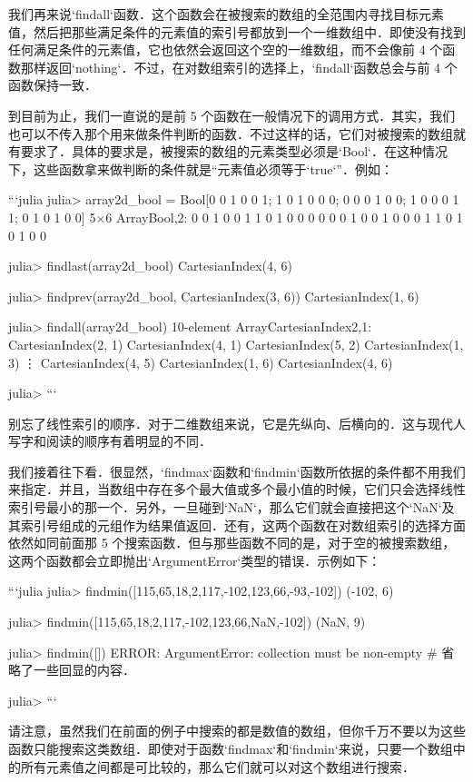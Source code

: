 我们再来说`findall`函数．这个函数会在被搜索的数组的全范围内寻找目标元素值，然后把那些满足条件的元素值的索引号都放到一个一维数组中．即使没有找到任何满足条件的元素值，它也依然会返回这个空的一维数组，而不会像前 4 个函数那样返回`nothing`．不过，在对数组索引的选择上，`findall`函数总会与前 4 个函数保持一致．

到目前为止，我们一直说的是前 5 个函数在一般情况下的调用方式．其实，我们也可以不传入那个用来做条件判断的函数．不过这样的话，它们对被搜索的数组就有要求了．具体的要求是，被搜索的数组的元素类型必须是`Bool`．在这种情况下，这些函数拿来做判断的条件就是“元素值必须等于`true`”．例如：

```julia
julia> array2d_bool = Bool[0 0 1 0 0 1; 1 0 1 0 0 0; 0 0 0 1 0 0; 1 0 0 0 1 1; 0 1 0 1 0 0]
5×6 Array{Bool,2}:
 0  0  1  0  0  1
 1  0  1  0  0  0
 0  0  0  1  0  0
 1  0  0  0  1  1
 0  1  0  1  0  0

julia> findlast(array2d_bool)
CartesianIndex(4, 6)

julia> findprev(array2d_bool, CartesianIndex(3, 6))
CartesianIndex(1, 6)

julia> findall(array2d_bool)
10-element Array{CartesianIndex{2},1}:
 CartesianIndex(2, 1)
 CartesianIndex(4, 1)
 CartesianIndex(5, 2)
 CartesianIndex(1, 3)
 ⋮                   
 CartesianIndex(4, 5)
 CartesianIndex(1, 6)
 CartesianIndex(4, 6)

julia> 
```

别忘了线性索引的顺序．对于二维数组来说，它是先纵向、后横向的．这与现代人写字和阅读的顺序有着明显的不同．

我们接着往下看．很显然，`findmax`函数和`findmin`函数所依据的条件都不用我们来指定．并且，当数组中存在多个最大值或多个最小值的时候，它们只会选择线性索引号最小的那一个．另外，一旦碰到`NaN`，那么它们就会直接把这个`NaN`及其索引号组成的元组作为结果值返回．还有，这两个函数在对数组索引的选择方面依然如同前面那 5 个搜索函数．但与那些函数不同的是，对于空的被搜索数组，这两个函数都会立即抛出`ArgumentError`类型的错误．示例如下：

```julia
julia> findmin([115,65,18,2,117,-102,123,66,-93,-102])
(-102, 6)

julia> findmin([115,65,18,2,117,-102,123,66,NaN,-102])
(NaN, 9)

julia> findmin([])
ERROR: ArgumentError: collection must be non-empty
# 省略了一些回显的内容．

julia> 
```

请注意，虽然我们在前面的例子中搜索的都是数值的数组，但你千万不要以为这些函数只能搜索这类数组．即使对于函数`findmax`和`findmin`来说，只要一个数组中的所有元素值之间都是可比较的，那么它们就可以对这个数组进行搜索．

